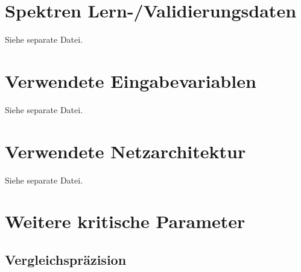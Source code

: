 \documentclass[11pt, a4paper]{article}
\begin{document}
\section{Spektren Lern-/Validierungsdaten}
\label{append:Spektren_Lern-/Validierungsdaten}
Siehe separate Datei.

\section{Verwendete Eingabevariablen}
\label{append:Verwendete_Eingabevariablen}
Siehe separate Datei.

\section{Verwendete Netzarchitektur}
\label{append:Verwendete_Netzarchitektur}
Siehe separate Datei.

\section{Weitere kritische Parameter}
\label{append:Weitere_kritische_Parameter}

\subsection{Vergleichspräzision}
\end{document}
